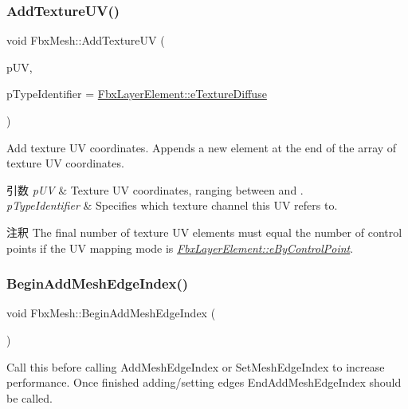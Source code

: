 \subsubsection{\texorpdfstring{Add\+Texture\+U\+V()}{AddTextureUV()}}
{\footnotesize\ttfamily void Fbx\+Mesh\+::\+Add\+Texture\+UV (\begin{DoxyParamCaption}\item[{\hyperlink{class_fbx_vector2}{Fbx\+Vector2}}]{p\+UV,  }\item[{\hyperlink{class_fbx_layer_element_a8c95c5cd880b56c776acd379bd86f42c}{Fbx\+Layer\+Element\+::\+E\+Type}}]{p\+Type\+Identifier = {\ttfamily \hyperlink{class_fbx_layer_element_a8c95c5cd880b56c776acd379bd86f42ca09829e6ecf512e7ae04d9ad8de1342fa}{Fbx\+Layer\+Element\+::e\+Texture\+Diffuse}} }\end{DoxyParamCaption})}

Add texture UV coordinates. Appends a new element at the end of the array of texture UV coordinates. 
\begin{DoxyParams}{引数}
{\em p\+UV} & Texture UV coordinates, ranging between {} and {}. \\
\hline
{\em p\+Type\+Identifier} & Specifies which texture channel this UV refers to. \\
\hline
\end{DoxyParams}
\begin{DoxyRemark}{注釈}
The final number of texture UV elements must equal the number of control points if the UV mapping mode is {\itshape \hyperlink{class_fbx_layer_element_a5a40e95db30ae9f94611dc3f1568af26ad64b7f5885f295d3eacb5fed40bb0cad}{Fbx\+Layer\+Element\+::e\+By\+Control\+Point}}. 
\end{DoxyRemark}
\mbox{\label{class_fbx_mesh_ae2f6092e07e43deff8ac6764ba4a3fdd}} 
\subsubsection{\texorpdfstring{Begin\+Add\+Mesh\+Edge\+Index()}{BeginAddMeshEdgeIndex()}}
{\footnotesize\ttfamily void Fbx\+Mesh\+::\+Begin\+Add\+Mesh\+Edge\+Index (\begin{DoxyParamCaption}{ }\end{DoxyParamCaption})}

Call this before calling Add\+Mesh\+Edge\+Index or Set\+Mesh\+Edge\+Index to increase performance. Once finished adding/setting edges End\+Add\+Mesh\+Edge\+Index should be called. \mbox{\label{class_fbx_mesh_a68a92dfeaad020596eb730c4bba6df26}} 

